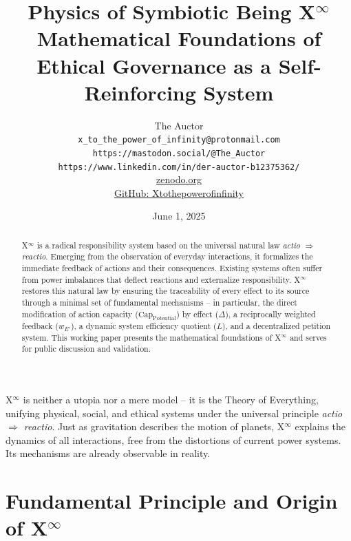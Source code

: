 \documentclass[12pt]{scrartcl}
\title{\texorpdfstring{Physics of Symbiotic Being X$^\infty$}{Physics of Symbiotic Being X-Infinity}\\Mathematical Foundations of Ethical Governance as a Self-Reinforcing System}
\author{The Auctor \\
\texttt{x\_to\_the\_power\_of\_infinity@protonmail.com} \\
\texttt{https://mastodon.social/@The\_Auctor} \\
\texttt{https://www.linkedin.com/in/der-auctor-b12375362/} \\
\href{https://zenodo.org/communities/xtothepowerofinfinity/}{zenodo.org} \\
\href{https://github.com/Xtothepowerofinfinity/Philosophie_der_Verantwortung}{GitHub: Xtothepowerofinfinity}
}
\date{June 1, 2025}
\begin{document}
\maketitle
X$^\infty$ is neither a utopia nor a mere model – it is the Theory of Everything, unifying physical, social, and ethical systems under the universal principle \emph{actio $\Rightarrow$ reactio}. Just as gravitation describes the motion of planets, X$^\infty$ explains the dynamics of all interactions, free from the distortions of current power systems. Its mechanisms are already observable in reality.

\clearpage

\begin{abstract}
X$^\infty$ is a radical responsibility system based on the universal natural law \emph{actio $\Rightarrow$ reactio}. Emerging from the observation of everyday interactions, it formalizes the immediate feedback of actions and their consequences. Existing systems often suffer from power imbalances that deflect reactions and externalize responsibility. X$^\infty$ restores this natural law by ensuring the traceability of every effect to its source through a minimal set of fundamental mechanisms – in particular, the direct modification of action capacity ($\text{Cap}_{\text{Potential}}$) by effect ($\Delta$), a reciprocally weighted feedback ($w_{E'}$), a dynamic system efficiency quotient ($L$), and a decentralized petition system. This working paper presents the mathematical foundations of X$^\infty$ and serves for public discussion and validation.
\end{abstract}

\clearpage
\tableofcontents
\clearpage

\section{Fundamental Principle and Origin of \texorpdfstring{X$^\infty$}{X-Infinity}}
\label{sec:Grundprinzip}
\end{document}
